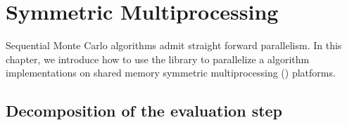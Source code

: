 %
%
%
%

\chapter{Symmetric Multiprocessing}
\label{chap:Symmetric Multiprocessing}

Sequential Monte Carlo algorithms admit straight forward parallelism. In this
chapter, we introduce how to use the library to parallelize a \smc algorithm
implementations on shared memory symmetric multiprocessing (\smp) platforms.

\section{Decomposition of the evaluation step}
\label{sec:Decomposition of the evaluation step}

